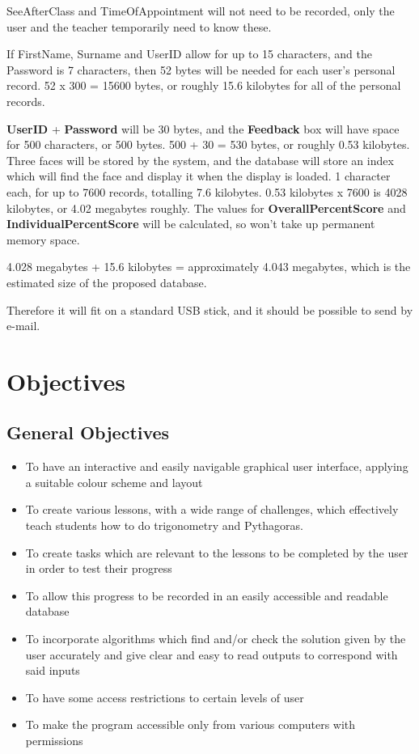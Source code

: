 SeeAfterClass and TimeOfAppointment will not need to be recorded, only the user and the teacher temporarily need to know these.

If FirstName, Surname and UserID allow for up to 15 characters, and the Password is 7 characters, then 52 bytes will be needed for each user's personal record. 52 x 300 = 15600 bytes, or roughly 15.6 kilobytes for all of the personal records.

\textbf{UserID} + \textbf{Password} will be 30 bytes, and the \textbf{Feedback} box will have space for 500 characters, or 500 bytes. 500 + 30 = 530 bytes, or roughly 0.53 kilobytes. Three faces will be stored by the system, and the database will store an index which will find the face and display it when the display is loaded. 1 character each, for up to 7600 records, totalling 7.6 kilobytes. 0.53 kilobytes x 7600 is 4028 kilobytes, or 4.02 megabytes roughly. The values for \textbf{OverallPercentScore} and \textbf{IndividualPercentScore} will be calculated, so won't take up permanent memory space.

4.028 megabytes + 15.6 kilobytes = approximately 4.043 megabytes, which is the estimated size of the proposed database.

Therefore it will fit on a standard USB stick, and it should be possible to send by e-mail.

\section{Objectives}

\subsection{General Objectives}

\begin{itemize}
	\item To have an interactive and easily navigable graphical user interface, applying a suitable colour scheme and layout
	\item To create various lessons, with a wide range of challenges, which effectively teach students how to do trigonometry and Pythagoras.
	\item To create tasks which are relevant to the lessons to be completed by the user in order to test their progress
	\item To allow this progress to be recorded in an easily accessible and readable database
	\item To incorporate algorithms which find and/or check the solution given by the user accurately and give clear and easy to read outputs to correspond with said inputs
	\item To have some access restrictions to certain levels of user
	\item To make the program accessible only from various computers with permissions
\end{itemize}

